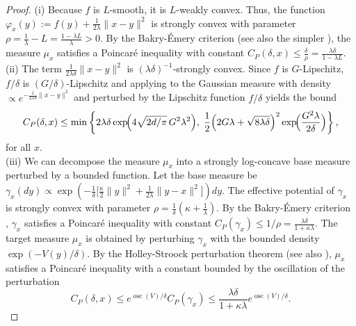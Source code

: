 \documentclass{article}
\newcommand{\osc}{\ensuremath{\operatorname{osc}}}
\begin{document}
\begin{proof}
    (i) Because $f$ is $L$-smooth, it is $L$-weakly convex. Thus, the function $\varphi_x(y) := f(y) + \frac{1}{2\lambda}\|x-y\|^2$ is strongly convex with parameter $\rho = \frac{1}{\lambda} - L = \frac{1-\lambda L}{\lambda} > 0$. By the Bakry-Émery criterion \cite[Proposition 4.8.1 and Corollary 4.8.2]{bakry2014analysis} (see also the simpler \cite{chewi2024log}), the measure $\mu_x$ satisfies a Poincaré inequality with constant $C_P(\delta, x) \leq \frac{\delta}{\rho} = \frac{\lambda\delta}{1-\lambda L}$.\\
    (ii) The term $\frac{1}{2\lambda\delta}\|x-y\|^2$ is $(\lambda\delta)^{-1}$-strongly convex.
Since $f$ is $G$-Lipschitz, $f/\delta$ is
$(G/\delta)$-Lipschitz and
applying \cite[Theorem 1.3(1) and (2)]{cattiaux2022perturbed} to the Gaussian measure with density $\propto e^{-\frac{1}{2\lambda\delta}\|x-y\|^2}$ and perturbed by the Lipschitz function $f/\delta$ yields the bound
\[
C_P(\delta,x)\le
\min\left\{
2\lambda\delta \exp\!\Bigl(4\sqrt{2d/\pi}\,G^2\lambda^2\Bigr),\;
\frac12\Bigl(2G\lambda+\sqrt{8\lambda\delta}\Bigr)^2
\exp\!\Bigl(\frac{G^2\lambda}{2\delta}\Bigr)
\right\},
\]
for all $x$.\\
(iii) We can decompose the measure $\mu_x$ into a strongly log-concave base measure perturbed by a bounded function. Let the base measure be $\gamma_x(dy) \propto \exp\left(-\frac{1}{\delta}\big[\frac{\kappa}{2}\|y\|^2 + \frac{1}{2\lambda}\|y-x\|^2\big]\right) dy$. The effective potential of $\gamma_x$ is strongly convex with parameter $\rho = \frac{1}{\delta}(\kappa + \frac{1}{\lambda})$. By the Bakry-Émery criterion \cite[Proposition 4.8.1 and Corollary 4.8.2]{bakry2014analysis}, $\gamma_x$ satisfies a Poincaré inequality with constant $C_P(\gamma_x) \le 1/\rho = \frac{\lambda \delta}{1+\kappa\lambda}$. The target measure $\mu_x$ is obtained by perturbing $\gamma_x$ with the bounded density $\exp(-V(y)/\delta)$. By the Holley-Stroock perturbation theorem \cite{holley1987} (see also \cite[Theorem 1.1]{cattiaux2022perturbed}), $\mu_x$ satisfies a Poincaré inequality with a constant bounded by the oscillation of the perturbation
\[
C_P(\delta, x) \le e^{\osc(V) / \delta} C_P(\gamma_x) \le \frac{\lambda \delta}{1+\kappa\lambda} e^{\osc(V) / \delta}.
\]
\end{proof}
\end{document}
